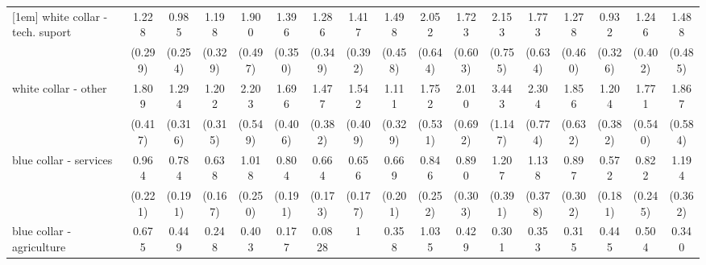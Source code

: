 {\begin{tabular}{l*{16}{c}}
[1em]
white collar - tech. suport&       1.228         &       0.985         &       1.198         &       1.900\sym{*}  &       1.396         &       1.286         &       1.417         &       1.498         &       2.052\sym{*}  &       1.723         &       2.153\sym{*}  &       1.773         &       1.278         &       0.932         &       1.246         &       1.488         \\
                    &     (0.299)         &     (0.254)         &     (0.329)         &     (0.497)         &     (0.350)         &     (0.349)         &     (0.392)         &     (0.458)         &     (0.644)         &     (0.603)         &     (0.755)         &     (0.634)         &     (0.460)         &     (0.326)         &     (0.402)         &     (0.485)         \\
[1em]
white collar - other&       1.809\sym{*}  &       1.294         &       1.202         &       2.203\sym{**} &       1.696\sym{*}  &       1.477         &       1.542         &       1.111         &       1.752         &       2.010\sym{*}  &       3.443\sym{***}&       2.304\sym{*}  &       1.856         &       1.204         &       1.771         &       1.867\sym{*}  \\
                    &     (0.417)         &     (0.316)         &     (0.315)         &     (0.549)         &     (0.406)         &     (0.382)         &     (0.409)         &     (0.329)         &     (0.531)         &     (0.692)         &     (1.147)         &     (0.774)         &     (0.632)         &     (0.382)         &     (0.540)         &     (0.584)         \\
[1em]
blue collar - services&       0.964         &       0.784         &       0.638         &       1.018         &       0.804         &       0.664         &       0.656         &       0.669         &       0.846         &       0.890         &       1.207         &       1.138         &       0.897         &       0.572         &       0.822         &       1.194         \\
                    &     (0.221)         &     (0.191)         &     (0.167)         &     (0.250)         &     (0.191)         &     (0.173)         &     (0.177)         &     (0.201)         &     (0.252)         &     (0.303)         &     (0.391)         &     (0.378)         &     (0.302)         &     (0.181)         &     (0.245)         &     (0.362)         \\
[1em]
blue collar - agriculture&       0.675         &       0.449         &       0.248\sym{*}  &       0.403         &       0.177\sym{*}  &      0.0828\sym{*}  &           1         &       0.358         &       1.035         &       0.429         &       0.301         &       0.353         &       0.315         &       0.445         &       0.504         &       0.340         \\

\end{tabular}}
